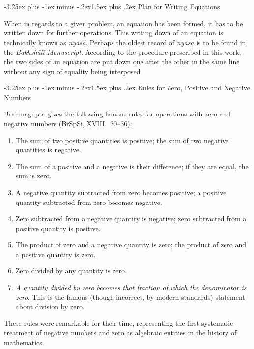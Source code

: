 \documentclass[11pt,a4paper]{article}
\makeatletter
\renewcommand{\subsection}{\@startsection{subsection}{2}{\z@}%
  {-3.25ex plus -1ex minus -.2ex}{1.5ex plus .2ex}%
  {\normalfont\large\bfseries\color{sectioncolor}}}
\makeatother
\begin{document}
\subsection{Plan for Writing Equations}

When in regards to a given problem, an equation has been formed, it has to be written down for further operations. This writing down of an equation is technically known as \textit{nyāsa}. Perhaps the oldest record of \textit{nyāsa} is to be found in the \textit{Bakhshālī Manuscript}. According to the procedure prescribed in this work, the two sides of an equation are put down one after the other in the same line without any sign of equality being interposed.

\subsection{Rules for Zero, Positive and Negative Numbers}

Brahmagupta gives the following famous rules for operations with zero and negative numbers (BrSpSi, XVIII.\ 30--36):

\begin{enumerate}[label=\arabic*.]
\item The sum of two positive quantities is positive; the sum of two negative quantities is negative.
\item The sum of a positive and a negative is their difference; if they are equal, the sum is zero.
\item A negative quantity subtracted from zero becomes positive; a positive quantity subtracted from zero becomes negative.
\item Zero subtracted from a negative quantity is negative; zero subtracted from a positive quantity is positive.
\item The product of zero and a negative quantity is zero; the product of zero and a positive quantity is zero.
\item Zero divided by any quantity is zero.
\item \textit{A quantity divided by zero becomes that fraction of which the denominator is zero.} This is the famous (though incorrect, by modern standards) statement about division by zero.
\end{enumerate}

These rules were remarkable for their time, representing the first systematic treatment of negative numbers and zero as algebraic entities in the history of mathematics.
\end{document}
